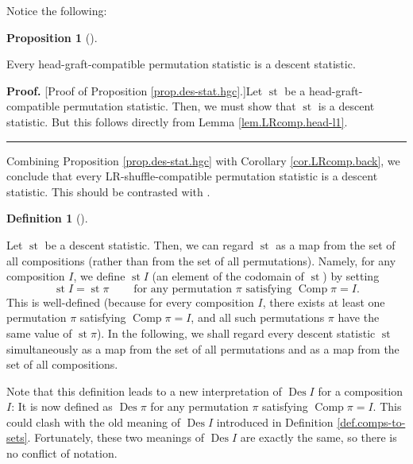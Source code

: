 \documentclass[numbers=enddot,12pt,final,onecolumn,notitlepage]{scrartcl}%
\theoremstyle{definition}
\newtheorem{prop}[theo]{Proposition}
\newenvironment{proposition}[1][]
{\begin{prop}[#1]\begin{leftbar}}
{\end{leftbar}\end{prop}}
\newtheorem{defi}[theo]{Definition}
\newenvironment{definition}[1][]
{\begin{defi}[#1]\begin{leftbar}}
{\end{leftbar}\end{defi}}
\newenvironment{proof}[1][Proof]{\noindent\textbf{#1.} }{\ \rule{0.5em}{0.5em}}
\newenvironment{verlong}{}{}
\begin{document}
\begin{verlong}
Notice the following:
\end{verlong}

\begin{proposition}
\label{prop.des-stat.hgc}Every head-graft-compatible permutation statistic is
a descent statistic.
\end{proposition}

\begin{verlong}
\begin{proof}
[Proof of Proposition \ref{prop.des-stat.hgc}.]Let $\operatorname*{st}$ be a
head-graft-compatible permutation statistic. Then, we must show that
$\operatorname*{st}$ is a descent statistic. But this follows directly from
Lemma \ref{lem.LRcomp.head-l1}.
\end{proof}

Combining Proposition \ref{prop.des-stat.hgc} with Corollary
\ref{cor.LRcomp.back}, we conclude that every LR-shuffle-compatible
permutation statistic is a descent statistic. This should be contrasted with
\cite[Conjecture 6.11]{part1}.
\end{verlong}

\begin{definition}
\label{def.des-stat.stI}Let $\operatorname*{st}$ be a descent statistic. Then,
we can regard $\operatorname*{st}$ as a map from the set of all compositions
(rather than from the set of all permutations). Namely, for any composition
$I$, we define $\operatorname*{st}I$ (an element of the codomain of
$\operatorname*{st}$) by setting%
\[
\operatorname*{st}I=\operatorname*{st}\pi\ \ \ \ \ \ \ \ \ \ \text{for any
permutation }\pi\text{ satisfying }\operatorname*{Comp}\pi=I.
\]
This is well-defined (because for every composition $I$, there exists at least
one permutation $\pi$ satisfying $\operatorname*{Comp}\pi=I$, and all such
permutations $\pi$ have the same value of $\operatorname*{st}\pi$). In the
following, we shall regard every descent statistic $\operatorname*{st}$
simultaneously as a map from the set of all permutations and as a map from the
set of all compositions.
\end{definition}

Note that this definition leads to a new interpretation of
$\operatorname*{Des}I$ for a composition $I$: It is now defined as
$\operatorname*{Des}\pi$ for any permutation $\pi$ satisfying
$\operatorname*{Comp}\pi=I$. This could clash with the old meaning of
$\operatorname*{Des}I$ introduced in Definition \ref{def.comps-to-sets}.
Fortunately, these two meanings of $\operatorname*{Des}I$ are exactly the
same, so there is no conflict of notation.
\end{document}
